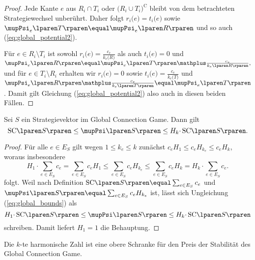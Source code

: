 \begin{proof}
  Jede Kante $e$ aus
  $R_i \cap T_i$ oder $\lparen R_i \cup T_i \rparen ^\mathrm{C}$
  bleibt von dem betrachteten Strategiewechsel unberührt.
  Daher folgt
  $r_i \lparen e \rparen \equal t_i \lparen e \rparen$
  sowie
  $\mupPsi_e \lparen T \rparen \equal \mupPsi_e \lparen R \rparen$
  und so auch (\ref{eq:global_potential2}).

  Für $e \in R_i \setminus T_i$ ist sowohl
  $r_i \lparen e \rparen \equal \frac{c_e}{k_e \lparen R \rparen}$
  als auch $t_i \lparen e \rparen \equal 0$
  und
  $
    \mupPsi_e \lparen R \rparen
    \equal
    \mupPsi_e \lparen T \rparen \mathplus \frac{c_e}{k_e \lparen R \rparen},
  $
  und für $e \in T_i \setminus R_i$ erhalten wir
  $r_i \lparen e \rparen \equal 0$
  sowie
  $t_i \lparen e \rparen \equal \frac{c_e}{k_e \lparen T \rparen}$
  und
  $
    \mupPsi_e \lparen R \rparen \mathplus \frac{c_e}{k_e \lparen T \rparen}
    \equal
    \mupPsi_e \lparen T \rparen
  $.
  Damit gilt Gleichung (\ref{eq:global_potential2})
  also auch in diesen beiden Fällen.
\end{proof}

\begin{lemma}
\label{la:global_bounds}
  Sei $S$ ein Strategievektor im Global Connection Game.
  Dann gilt
  \[
    \SC{S} \leq \mupPsi \lparen S \rparen \leq H_k \cdotp \SC{S}.
  \]
\end{lemma}

\begin{proof}
  Für alle $e \in E_S$ gilt wegen $1 \leq k_e \leq k$ zunächst
  $c_e H_1 \leq c_e H_{ k_e } \leq c_e H_k$,
  woraus insbesondere
  \begin{equation}
  \label{eq:global_bounds}
    H_1 \cdotp \sum_{ e \in E_S } c_e
    \equal
    \sum_{ e \in E_S } c_e H_1
    \leq
    \sum_{ e \in E_S } c_e H_{ k_e }
    \leq
    \sum_{ e \in E_S } c_e H_k
    \equal
    H_k \cdotp \sum_{ e \in E_S } c_e.
  \end{equation}
  folgt.
  Weil nach Definition $\SC{S} \equal \sum_{ e \in E_S } c_e$
  und $\mupPsi \lparen S \rparen \equal \sum_{ e \in E_S } c_e H_{ k_e }$ ist,
  lässt sich Ungleichung (\ref{eq:global_bounds}) als
  \[
    H_1 \cdotp \SC{S}
    \leq
    \mupPsi \lparen S \rparen
    \leq
    H_k \cdotp \SC{S}
  \]
  schreiben.
  Damit liefert $H_1 \equal 1$ die Behauptung.
\end{proof}

\begin{satz}
  Die $k$-te harmonische Zahl ist eine obere Schranke
  für den Preis der Stabilität des Global Connection Game.
\end{satz}

